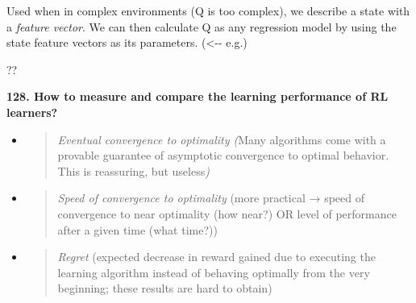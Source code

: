 Used when in complex environments (Q is too complex), we describe a
state with a \emph{feature vector}. We can then calculate Q as any
regression model by using the state feature vectors as its parameters.
(\textless-\/- e.g.)

??

\textbf{128. How to measure and compare the learning performance of RL
learners?}

\begin{itemize}
\item
  \begin{quote}
  \textit{Eventual convergence to optimality (}Many algorithms come
  with a provable guarantee of asymptotic convergence to optimal
  behavior. This is reassuring, but useless\textit{)}
  \end{quote}
\item
  \begin{quote}
  \textit{Speed of convergence to optimality} (more practical → speed
  of convergence to near optimality (how near?) OR level of performance
  after a given time (what time?))
  \end{quote}
\item
  \begin{quote}
  \textit{Regret} (expected decrease in reward gained due to
  executing the learning algorithm instead of behaving optimally from
  the very beginning; these results are hard to obtain)
  \end{quote}
\end{itemize}
